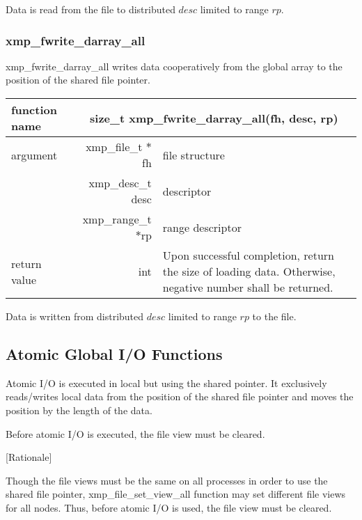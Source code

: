    Data is read from the file to distributed $desc$ limited to range $rp$.

   \subsubsection{xmp\_fwrite\_darray\_all}
   xmp\_fwrite\_darray\_all writes data cooperatively from the global array to the
   position of the shared file pointer.

   \begin{table}[h]
    \begin{center}
     \begin{tabular}{|l|r|p{80mm}|}
      \hline
      {\bf function name}  & \multicolumn{2}{c|}{\bf size\_t
      xmp\_fwrite\_darray\_all(fh, desc, rp)} \\ \hline \hline
      argument & xmp\_file\_t $*$fh & file structure \\ \cline{2-3}
      & xmp\_desc\_t desc & descriptor \\ \cline{2-3}
      & xmp\_range\_t $*$rp & range descriptor \\ \hline
      return value & int & Upon successful completion, return the size
	      of loading data. Otherwise, negative number shall be
	      returned. \\ \hline
      \end{tabular}
     \end{center}
    \label{tb:aaa}
   \end{table}

   Data is written from distributed $desc$ limited to range $rp$ to the file.


   \subsection{Atomic Global I/O Functions}

   Atomic I/O is executed in local but using the shared pointer. 
   It exclusively reads/writes local data
   from the position of the shared file pointer and moves the position by the length of the data.

   Before atomic I/O is executed, the file view must be cleared.
   
   [Rationale]

   Though the file views must be the same on all processes in order to use the shared file pointer,
   xmp\_file\_set\_view\_all
   function may set different file views for all nodes.
   Thus, before atomic I/O is used, the file view must be cleared.

